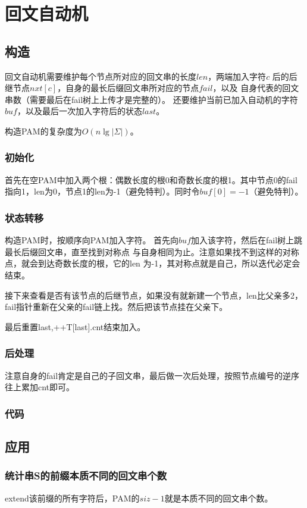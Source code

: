 \section{回文自动机}
\subsection{构造}
回文自动机需要维护每个节点所对应的回文串的长度$len$，两端加入字符$c$
后的后继节点$nxt[c]$，自身的最长后缀回文串所对应的节点$fail$，以及
自身代表的回文串数（需要最后在fail树上上传才是完整的）。
还要维护当前已加入自动机的字符$buf$，以及最后一次加入字符后的状态$last$。

构造PAM的复杂度为$O(n\lg |\Sigma|)$。
\subsubsection{初始化}
首先在空PAM中加入两个根：偶数长度的根0和奇数长度的根1。其中节点0的fail
指向1，len为0，节点1的len为-1（避免特判）。同时令$buf[0]=-1$（避免特判）。
\subsubsection{状态转移}
构造PAM时，按顺序向PAM加入字符。
首先向$buf$加入该字符，然后在fail树上跳最长后缀回文串，直至找到对称点
与自身相同为止。注意如果找不到这样的对称点，就会到达奇数长度的根，它的len
为-1，其对称点就是自己，所以迭代必定会结束。

接下来查看是否有该节点的后继节点，如果没有就新建一个节点，len比父亲多2，
fail指针重新在父亲的fail链上找。然后把该节点挂在父亲下。

最后重置last,++T[last].cnt结束加入。
\subsubsection{后处理}
注意自身的fail肯定是自己的子回文串，最后做一次后处理，按照节点编号的逆序
往上累加cnt即可。
\subsubsection{代码}

\subsection{应用}
\subsubsection{统计串S的前缀本质不同的回文串个数}
extend该前缀的所有字符后，PAM的$siz-1$就是本质不同的回文串个数。
